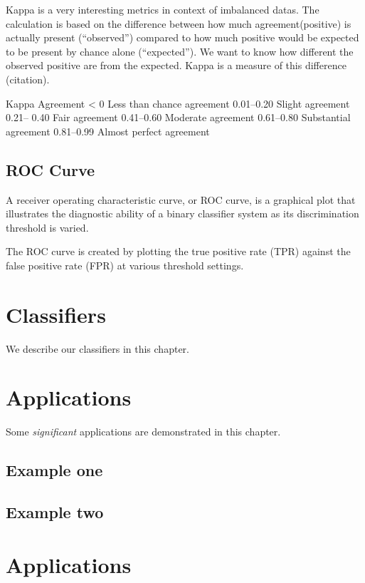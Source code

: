 \documentclass[
]{book}
\begin{document}
Kappa is a very interesting metrics in context of imbalanced datas.
The calculation is based on the difference between how much agreement(positive) is actually present (``observed'') compared to how much positive would be expected to be present by chance alone (``expected''). We want to know how different the observed positive are from the expected. Kappa is a measure of this difference (citation).

Kappa Agreement
\textless{} 0 Less than chance agreement
0.01--0.20 Slight agreement
0.21-- 0.40 Fair agreement
0.41--0.60 Moderate agreement
0.61--0.80 Substantial agreement
0.81--0.99 Almost perfect agreement

\hypertarget{roc-curve}{%
\section{ROC Curve}\label{roc-curve}}

A receiver operating characteristic curve, or ROC curve, is a graphical plot that illustrates the diagnostic ability of a binary classifier system as its discrimination threshold is varied.

The ROC curve is created by plotting the true positive rate (TPR) against the false positive rate (FPR) at various threshold settings.

\hypertarget{classifiers}{%
\chapter{Classifiers}\label{classifiers}}

We describe our classifiers in this chapter.

\hypertarget{applications}{%
\chapter{Applications}\label{applications}}

Some \emph{significant} applications are demonstrated in this chapter.

\hypertarget{example-one}{%
\section{Example one}\label{example-one}}

\hypertarget{example-two}{%
\section{Example two}\label{example-two}}

\hypertarget{applications-1}{%
\chapter{Applications}\label{applications-1}}

  
\end{document}
